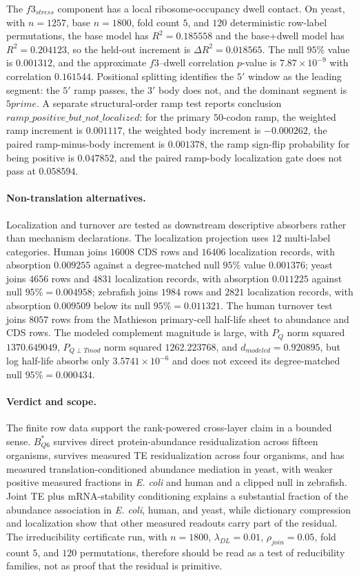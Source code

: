 The $f3_{stress}$ component has a local ribosome-occupancy dwell contact.  On yeast, with $n=1257$, base $n=1800$, fold count $5$, and $120$ deterministic row-label permutations, the base model has $R^2=0.185558$ and the base+dwell model has $R^2=0.204123$, so the held-out increment is $\Delta R^2=0.018565$.  The null $95\%$ value is $0.001312$, and the approximate $f3$--dwell correlation $p$-value is $7.87\times 10^{-9}$ with correlation $0.161544$.  Positional splitting identifies the $5'$ window as the leading segment: the $5'$ ramp passes, the $3'$ body does not, and the dominant segment is $5prime$.  A separate structural-order ramp test reports conclusion $ramp\_positive\_but\_not\_localized$: for the primary $50$-codon ramp, the weighted ramp increment is $0.001117$, the weighted body increment is $-0.000262$, the paired ramp-minus-body increment is $0.001378$, the ramp sign-flip probability for being positive is $0.047852$, and the paired ramp-body localization gate does not pass at $0.058594$.

\paragraph{Non-translation alternatives.}
Localization and turnover are tested as downstream descriptive absorbers rather than mechanism declarations.  The localization projection uses $12$ multi-label categories.  Human joins $16008$ CDS rows and $16406$ localization records, with absorption $0.009255$ against a degree-matched null $95\%$ value $0.001376$; yeast joins $4656$ rows and $4831$ localization records, with absorption $0.011225$ against null $95\%=0.004958$; zebrafish joins $1984$ rows and $2821$ localization records, with absorption $0.009509$ below its null $95\%=0.011321$.  The human turnover test joins $8057$ rows from the Mathieson primary-cell half-life sheet to abundance and CDS rows.  The modeled complement magnitude is large, with $P_Q$ norm squared $1370.649049$, $P_{Q\perp Tmod}$ norm squared $1262.223768$, and $d_{modeled}=0.920895$, but log half-life absorbs only $3.5741\times 10^{-6}$ and does not exceed its degree-matched null $95\%=0.000434$.

\paragraph{Verdict and scope.}
The finite row data support the rank-powered cross-layer claim in a bounded sense.  $B^*_{Q6}$ survives direct protein-abundance residualization across fifteen organisms, survives measured TE residualization across four organisms, and has measured translation-conditioned abundance mediation in yeast, with weaker positive measured fractions in \emph{E. coli} and human and a clipped null in zebrafish.  Joint TE plus mRNA-stability conditioning explains a substantial fraction of the abundance association in \emph{E. coli}, human, and yeast, while dictionary compression and localization show that other measured readouts carry part of the residual.  The irreducibility certificate run, with $n=1800$, $\lambda_{DL}=0.01$, $\rho_{join}=0.05$, fold count $5$, and $120$ permutations, therefore should be read as a test of reducibility families, not as proof that the residual is primitive.

